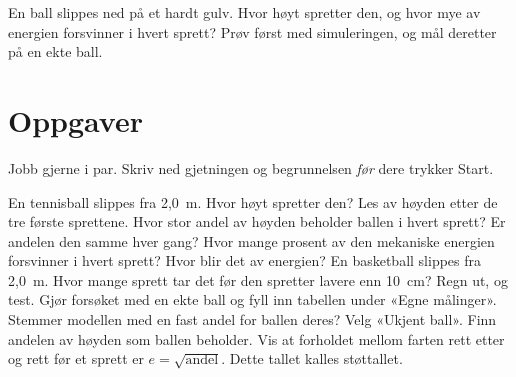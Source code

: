 \documentclass[11pt]{article}
\begin{document}

En ball slippes ned på et hardt gulv. Hvor høyt spretter den, og hvor mye av energien forsvinner i hvert sprett? Prøv først med simuleringen, og mål deretter på en ekte ball.

\section*{Oppgaver}

Jobb gjerne i par. Skriv ned gjetningen og begrunnelsen \emph{før} dere trykker Start.

\begin{oppgaveliste}
\oppgave {}En tennisball slippes fra 2,0~m. Hvor høyt spretter den?
\svar
\oppgave {}Les av høyden etter de tre første sprettene. Hvor stor andel av høyden beholder ballen i hvert sprett? Er andelen den samme hver gang?
\svar
\oppgave {}Hvor mange prosent av den mekaniske energien forsvinner i hvert sprett? Hvor blir det av energien?
\svar
\oppgave {}En basketball slippes fra 2,0~m. Hvor mange sprett tar det før den spretter lavere enn 10~cm? Regn ut, og test.
\svar
\oppgave {}Gjør forsøket med en ekte ball og fyll inn tabellen under «Egne målinger». Stemmer modellen med en fast andel for ballen deres?
\svar
\oppgave {}Velg «Ukjent ball». Finn andelen av høyden som ballen beholder. Vis at forholdet mellom farten rett etter og rett før et sprett er $e = \sqrt{\text{andel}}$. Dette tallet kalles støttallet.
\svar
\end{oppgaveliste}
\end{document}

